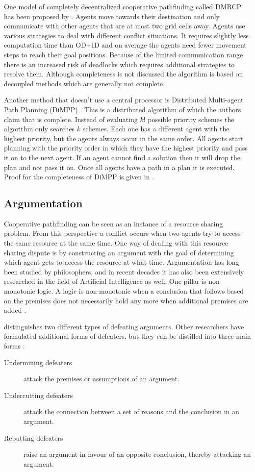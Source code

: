 One model of completely decentralized cooperative pathfinding called DMRCP has
been proposed by \citep{wei2016}. Agents move towards their destination and only
communicate with other agents that are at most two grid cells away. Agents use
various strategies to deal with different conflict situations. It requires
slightly less computation time than OD+ID and on average the agents need fewer
movement steps to reach their goal positions. Because of the limited
communication range there is an increased risk of deadlocks which requires
additional strategies to resolve them. Although completeness is not discussed
the algorithm is based on decoupled methods which are generally not complete.

Another method that doesn't use a central processor is Distributed Multi-agent
Path Planning (DiMPP) \citep{chouhan2017}. This is a distributed algorithm of
which the authors claim that is complete. Instead of evaluating $k!$ possible
priority schemes the algorithm only searches $k$ schemes. Each one has a
different agent with the highest priority, but the agents always occur in the
same order. All agents start planning with the priority order in which they
have the highest priority and pass it on to the next agent. If an agent cannot
find a solution then it will drop the plan and not pass it on. Once all agents
have a path in a plan it is executed. Proof for the completeness of DiMPP is
given in \cite[subsection 5.1]{chouhan2017}.

\subsection{Argumentation}
Cooperative pathfinding can be seen as an instance of a resource sharing
problem. From this perspective a conflict occurs when two agents try to access
the same resource at the same time. One way of dealing with this resource
sharing dispute is by constructing an argument with the goal of determining
which agent gets to access the resource at what time. Argumentation has long
been studied by philosophers, and in recent decades it has also been
extensively researched in the field of Artificial Intelligence as well. One
pillar is non-monotonic logic. A logic is non-monotonic when a conclusion that
follows based on the premises does not necessarily hold any more when
additional premises are added \citep{vaneemeren2014,modgil2013}.

\citep{pollock1995} distinguishes two different types of defeating arguments.
Other researchers have formulated additional forms of defeaters, but they can
be distilled into three main forms \citep{vaneemeren2014}:
\begin{description}
	\item[Undermining defeaters] attack the premises or assumptions of an
	argument.
	\item[Undercutting defeaters] attack the connection between a set of
	reasons and the conclusion in an argument.
	\item[Rebutting defeaters] raise an argument in favour of an opposite
	conclusion, thereby attacking an argument.
\end{description}

